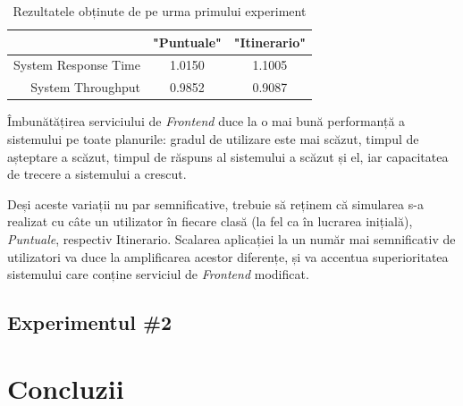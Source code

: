 \documentclass[12pt]{article}
\begin{document}
            \begin{table}[!h]
                \centering
                \begin{tabular}{r|cc}
                    \multicolumn{1}{c|}{} & "Puntuale" & "Itinerario" \\ \hline
                    System Response Time  & 1.0150     & 1.1005       \\
                    System Throughput     & 0.9852     & 0.9087      
                \end{tabular}
                \caption{Rezultatele obținute de pe urma primului experiment}
            \end{table}

            Îmbunătățirea serviciului de \textit{Frontend} duce la o mai bună performanță a sistemului pe toate planurile: gradul de utilizare este mai scăzut, timpul de așteptare a scăzut, timpul de răspuns al sistemului a scăzut și el, iar capacitatea de trecere a sistemului a crescut.

            Deși aceste variații nu par semnificative, trebuie să reținem că simularea s-a realizat cu câte un utilizator în fiecare clasă (la fel ca în lucrarea inițială), \textit{Puntuale}, respectiv {Itinerario}. Scalarea aplicației la un număr mai semnificativ de utilizatori va duce la amplificarea acestor diferențe, și va accentua superioritatea sistemului care conține serviciul de \textit{Frontend} modificat.
        
        \subsection{Experimentul \#2}
            \lipsum[1-2]

    \section{Concluzii}
        \lipsum[1-2]
\end{document}
